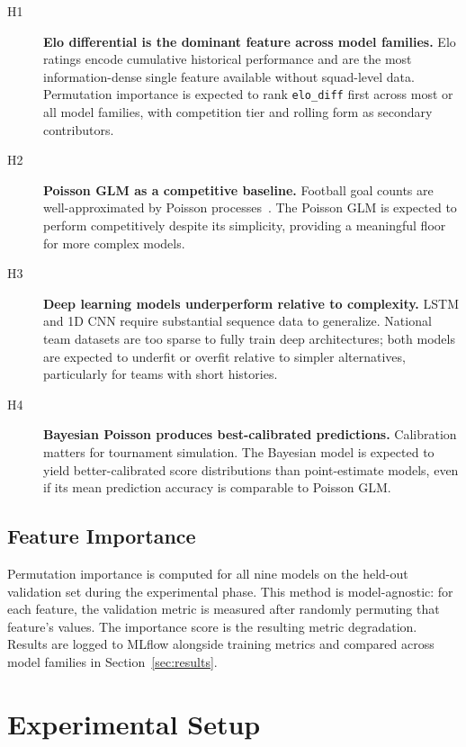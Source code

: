 \documentclass[conference]{IEEEtran}
\begin{document}
\begin{description}
  \item[H1] \textbf{Elo differential is the dominant feature across model families.}
  Elo ratings encode cumulative historical performance and are the most information-dense
  single feature available without squad-level data. Permutation importance is expected to
  rank \texttt{elo\_diff} first across most or all model families, with competition tier
  and rolling form as secondary contributors.

  \item[H2] \textbf{Poisson GLM as a competitive baseline.}
  Football goal counts are well-approximated by Poisson processes~\cite{dixon1997modelling}.
  The Poisson GLM is expected to perform competitively despite its simplicity, providing
  a meaningful floor for more complex models.

  \item[H3] \textbf{Deep learning models underperform relative to complexity.}
  LSTM and 1D CNN require substantial sequence data to generalize. National team datasets
  are too sparse to fully train deep architectures; both models are expected to underfit
  or overfit relative to simpler alternatives, particularly for teams with short histories.

  \item[H4] \textbf{Bayesian Poisson produces best-calibrated predictions.}
  Calibration matters for tournament simulation. The Bayesian model is expected to yield
  better-calibrated score distributions than point-estimate models, even if its mean
  prediction accuracy is comparable to Poisson GLM.
\end{description}

\subsection{Feature Importance}

Permutation importance is computed for all nine models on the held-out validation set
during the experimental phase. This method is model-agnostic: for each feature, the
validation metric is measured after randomly permuting that feature's values. The
importance score is the resulting metric degradation. Results are logged to MLflow
alongside training metrics and compared across model families in Section~\ref{sec:results}.

\section{Experimental Setup}
\label{sec:experiments}
\end{document}
